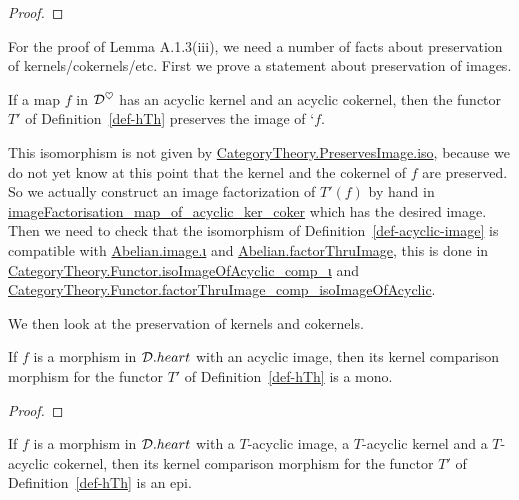 \begin{proof}
\leanok
\end{proof}


For the proof of Lemma A.1.3(iii), we need a number of facts about preservation of kernels/cokernels/etc.
First we prove a statement about preservation of images.

\begin{definition}
\label{def-acyclic-image}
\leanok 
{}
If a map $f$ in $\mathcal{D}^\heartsuit$ has an acyclic kernel and an acyclic cokernel, then
the functor $T'$ of Definition~\ref{def-hTh} preserves the image of `$f$.

\end{definition}

\begin{remark}
This isomorphism is not given by \url{CategoryTheory.PreservesImage.iso}, because we do not yet know at this 
point that the kernel and the cokernel of $f$ are preserved. So we actually construct an image factorization of
$T'(f)$ by hand in \url{imageFactorisation_map_of_acyclic_ker_coker} which has the desired image. Then we need
to check that the isomorphism of Definition~\ref{def-acyclic-image} is compatible with \url{Abelian.image.ι}
and \url{Abelian.factorThruImage}, this is done in \url{CategoryTheory.Functor.isoImageOfAcyclic_comp_ι}
and \url{CategoryTheory.Functor.factorThruImage_comp_isoImageOfAcyclic}.

\end{remark}

We then look at the preservation of kernels and cokernels.

\begin{lemma}
\label{prop-mono_kernelComparison_of_acyclic_image}
\leanok 
{}
If $f$ is a morphism in $\mathcal{D}.heart$ with an acyclic image, then its kernel comparison morphism
for the functor $T'$ of Definition~\ref{def-hTh} is a mono.

\end{lemma}

\begin{proof}
\leanok
\end{proof}


\begin{lemma}
\label{prop-epi_kernelComparison_of_acyclic_homology}
\leanok 
{}
If $f$ is a morphism in $\mathcal{D}.heart$ with a $T$-acyclic image, a $T$-acyclic kernel and a $T$-acyclic cokernel,
then its kernel comparison morphism
for the functor $T'$ of Definition~\ref{def-hTh} is an epi.

\end{lemma}

